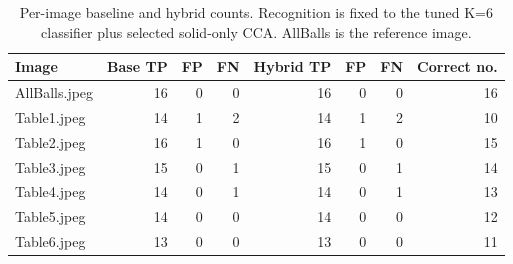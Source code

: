 \begin{table}[htbp]
\centering
\small
\caption{Per-image baseline and hybrid counts. Recognition is fixed to the tuned K=6 classifier plus selected solid-only CCA. AllBalls is the reference image.}
\label{tab:watershed-images}
\begin{tabular}{lrrrrrrr}
\toprule
Image & Base TP & FP & FN & Hybrid TP & FP & FN & Correct no. \\
\midrule
AllBalls.jpeg & 16 & 0 & 0 & 16 & 0 & 0 & 16 \\
Table1.jpeg & 14 & 1 & 2 & 14 & 1 & 2 & 10 \\
Table2.jpeg & 16 & 1 & 0 & 16 & 1 & 0 & 15 \\
Table3.jpeg & 15 & 0 & 1 & 15 & 0 & 1 & 14 \\
Table4.jpeg & 14 & 0 & 1 & 14 & 0 & 1 & 13 \\
Table5.jpeg & 14 & 0 & 0 & 14 & 0 & 0 & 12 \\
Table6.jpeg & 13 & 0 & 0 & 13 & 0 & 0 & 11 \\
\bottomrule
\end{tabular}
\end{table}
\FloatBarrier
